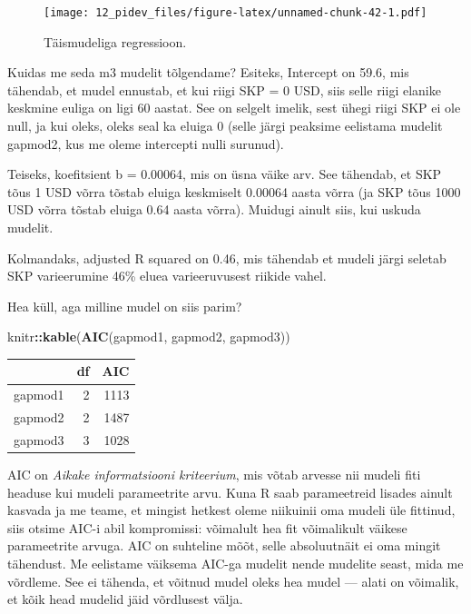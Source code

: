\documentclass[]{book}
\newenvironment{Shaded}{\begin{snugshade}}{\end{snugshade}}
\newcommand{\KeywordTok}[1]{\textcolor[rgb]{0.13,0.29,0.53}{\textbf{#1}}}
\newcommand{\OperatorTok}[1]{\textcolor[rgb]{0.81,0.36,0.00}{\textbf{#1}}}
\newcommand{\NormalTok}[1]{#1}
\begin{document}
\begin{figure}
\centering
\texttt{[image: 12\_pidev\_files/figure-latex/unnamed-chunk-42-1.pdf]}
\caption{\label{fig:unnamed-chunk-42}Täismudeliga regressioon.}
\end{figure}

Kuidas me seda m3 mudelit tõlgendame? Esiteks, Intercept on 59.6, mis
tähendab, et mudel ennustab, et kui riigi SKP = 0 USD, siis selle riigi
elanike keskmine euliga on ligi 60 aastat. See on selgelt imelik, sest
ühegi riigi SKP ei ole null, ja kui oleks, oleks seal ka eluiga 0 (selle
järgi peaksime eelistama mudelit gapmod2, kus me oleme intercepti nulli
surunud).

Teiseks, koefitsient b = 0.00064, mis on üsna väike arv. See tähendab,
et SKP tõus 1 USD võrra tõstab eluiga keskmiselt 0.00064 aasta võrra (ja
SKP tõus 1000 USD võrra tõstab eluiga 0.64 aasta võrra). Muidugi ainult
siis, kui uskuda mudelit.

Kolmandaks, adjusted R squared on 0.46, mis tähendab et mudeli järgi
seletab SKP varieerumine 46\% eluea varieeruvusest riikide vahel.

Hea küll, aga milline mudel on siis parim?

\begin{Shaded}
\begin{Highlighting}[]
\NormalTok{knitr}\OperatorTok{::}\KeywordTok{kable}\NormalTok{(}\KeywordTok{AIC}\NormalTok{(gapmod1, gapmod2, gapmod3))}
\end{Highlighting}
\end{Shaded}

\begin{tabular}{l|r|r}
\hline
  & df & AIC\\
\hline
gapmod1 & 2 & 1113\\
\hline
gapmod2 & 2 & 1487\\
\hline
gapmod3 & 3 & 1028\\
\hline
\end{tabular}

AIC on \emph{Aikake informatsiooni kriteerium}, mis võtab arvesse nii
mudeli fiti headuse kui mudeli parameetrite arvu. Kuna R saab
parameetreid lisades ainult kasvada ja me teame, et mingist hetkest
oleme niikuinii oma mudeli üle fittinud, siis otsime AIC-i abil
kompromissi: võimalult hea fit võimalikult väikese parameetrite arvuga.
AIC on suhteline mõõt, selle absoluutnäit ei oma mingit tähendust. Me
eelistame väiksema AIC-ga mudelit nende mudelite seast, mida me
võrdleme. See ei tähenda, et võitnud mudel oleks hea mudel --- alati on
võimalik, et kõik head mudelid jäid võrdlusest välja.
\end{document}
